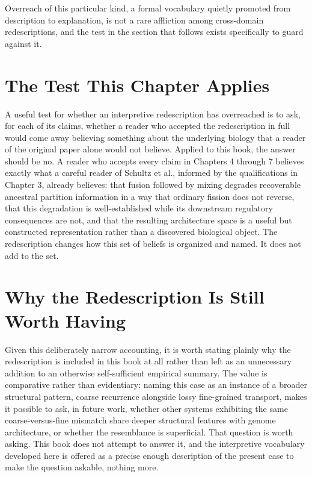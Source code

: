 \documentclass[11pt]{book}
\begin{document}
Overreach of this particular kind, a formal vocabulary quietly promoted from description to explanation, is not a rare affliction among cross-domain redescriptions, and the test in the section that follows exists specifically to guard against it.

\section{The Test This Chapter Applies}

A useful test for whether an interpretive redescription has overreached is to ask, for each of its claims, whether a reader who accepted the redescription in full would come away believing something about the underlying biology that a reader of the original paper alone would not believe. Applied to this book, the answer should be no. A reader who accepts every claim in Chapters 4 through 7 believes exactly what a careful reader of Schultz et al., informed by the qualifications in Chapter 3, already believes: that fusion followed by mixing degrades recoverable ancestral partition information in a way that ordinary fission does not reverse, that this degradation is well-established while its downstream regulatory consequences are not, and that the resulting architecture space is a useful but constructed representation rather than a discovered biological object. The redescription changes how this set of beliefs is organized and named. It does not add to the set.

\section{Why the Redescription Is Still Worth Having}

Given this deliberately narrow accounting, it is worth stating plainly why the redescription is included in this book at all rather than left as an unnecessary addition to an otherwise self-sufficient empirical summary. The value is comparative rather than evidentiary: naming this case as an instance of a broader structural pattern, coarse recurrence alongside lossy fine-grained transport, makes it possible to ask, in future work, whether other systems exhibiting the same coarse-versus-fine mismatch share deeper structural features with genome architecture, or whether the resemblance is superficial. That question is worth asking. This book does not attempt to answer it, and the interpretive vocabulary developed here is offered as a precise enough description of the present case to make the question askable, nothing more.
\end{document}
